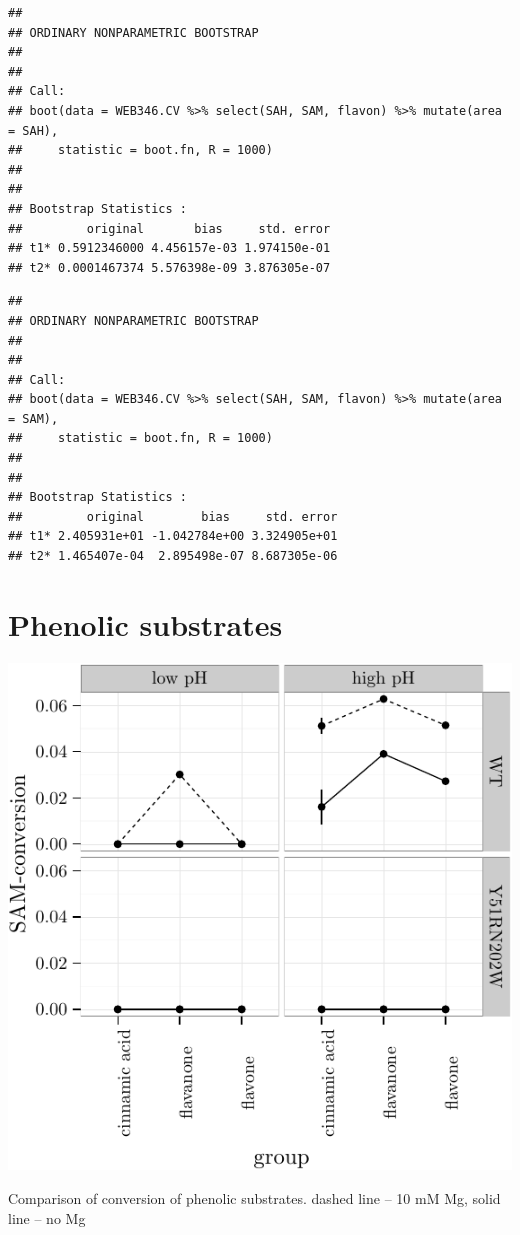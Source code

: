 \documentclass[]{tufte-handout}
\begin{document}
\begin{verbatim}
## 
## ORDINARY NONPARAMETRIC BOOTSTRAP
## 
## 
## Call:
## boot(data = WEB346.CV %>% select(SAH, SAM, flavon) %>% mutate(area = SAH), 
##     statistic = boot.fn, R = 1000)
## 
## 
## Bootstrap Statistics :
##         original       bias     std. error
## t1* 0.5912346000 4.456157e-03 1.974150e-01
## t2* 0.0001467374 5.576398e-09 3.876305e-07
\end{verbatim}

\begin{verbatim}
## 
## ORDINARY NONPARAMETRIC BOOTSTRAP
## 
## 
## Call:
## boot(data = WEB346.CV %>% select(SAH, SAM, flavon) %>% mutate(area = SAM), 
##     statistic = boot.fn, R = 1000)
## 
## 
## Bootstrap Statistics :
##         original        bias     std. error
## t1* 2.405931e+01 -1.042784e+00 3.324905e+01
## t2* 1.465407e-04  2.895498e-07 8.687305e-06
\end{verbatim}

\newpage

\section{Phenolic substrates}\label{phenolic-substrates}

\begin{marginfigure}
 \includegraphics{tufte_files/figure-latex/plot_conversion_phenol-1.pdf}
\caption{Comparison of conversion of phenolic substrates. dashed line -- 10 mM Mg, solid line -- no Mg}
\end{marginfigure}
\end{document}
